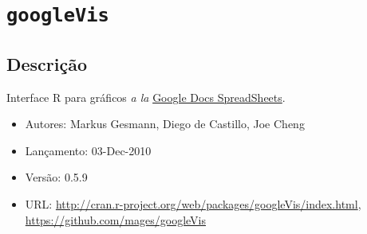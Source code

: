 \section{\texttt{googleVis}}


\subsection{Descrição}

\begin{frame}

  Interface R para gráficos \textit{a la}
  \href{https://developers.google.com/chart/interactive/docs/gallery}{Google
    Docs SpreadSheets}.
  \vspace{2em}

  \begin{itemize}
  \item Autores: Markus Gesmann, Diego de Castillo, Joe Cheng
  \item Lançamento: 03-Dec-2010
  \item Versão: 0.5.9
  \item URL:
    \url{http://cran.r-project.org/web/packages/googleVis/index.html},
    \url{https://github.com/mages/googleVis}
  \end{itemize}
  
\end{frame}

